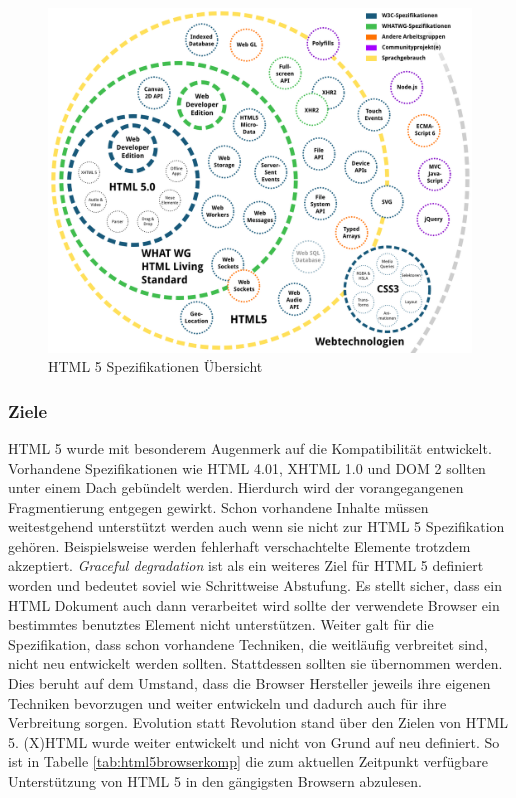 \begin{figure}[htb]
  \centering
  \includegraphics[width=0.7\linewidth]{abb/html5_specs}
  \caption[HTML 5 Spezifikationen Übersicht]{HTML 5 Spezifikationen Übersicht\footnotemark}
  \label{fig:html5specs}
\end{figure}

\subsubsection{Ziele} HTML 5 wurde mit besonderem Augenmerk auf die Kompatibilität entwickelt. Vorhandene Spezifikationen wie HTML 4.01, XHTML 1.0 und DOM 2 sollten unter einem Dach gebündelt werden. Hierdurch wird der vorangegangenen Fragmentierung entgegen gewirkt. Schon vorhandene Inhalte müssen weitestgehend unterstützt werden auch wenn sie nicht zur HTML 5 Spezifikation gehören. Beispielsweise werden fehlerhaft verschachtelte Elemente trotzdem akzeptiert. \textit{Graceful degradation} ist als ein weiteres Ziel für HTML 5 definiert worden und bedeutet soviel wie \glqq Schrittweise Abstufung\grqq{}. Es stellt sicher, dass ein HTML Dokument auch dann verarbeitet wird sollte der verwendete Browser ein bestimmtes benutztes Element nicht unterstützen. Weiter galt für die Spezifikation, dass schon vorhandene Techniken, die weitläufig verbreitet sind, nicht neu entwickelt werden sollten. Stattdessen sollten sie übernommen werden. Dies beruht auf dem Umstand, dass die Browser Hersteller jeweils ihre eigenen Techniken bevorzugen und weiter entwickeln und dadurch auch für ihre Verbreitung sorgen. Evolution statt Revolution stand über den Zielen von HTML 5. (X)HTML wurde weiter entwickelt und nicht von Grund auf neu definiert. So ist in Tabelle \ref{tab:html5browserkomp} die zum aktuellen Zeitpunkt verfügbare Unterstützung von HTML 5 in den gängigsten Browsern abzulesen.

